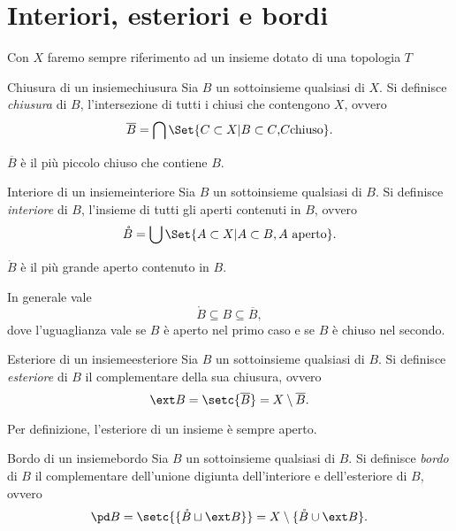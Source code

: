 \section{Interiori, esteriori e bordi}
Con \(X\) faremo sempre riferimento ad un insieme dotato di una topologia \(T\)

\begin{defn}{Chiusura di un insieme}{chiusura}
	Sia \(B\) un sottoinsieme qualsiasi di \(X\).
	Si definisce \emph{chiusura} di \(B\), l'intersezione di tutti i chiusi che contengono \(X\), ovvero
	\[
		\overline{B}=\bigcap\Set{C\subset X | B\subset C\text,C\text{chiuso}}.
	\]
\end{defn}

\begin{oss}
	\(\overline{B}\) è il più piccolo chiuso che contiene \(B\).
\end{oss}

\begin{defn}{Interiore di un insieme}{interiore}
	Sia \(B\) un sottoinsieme qualsiasi di \(B\).
	Si definisce \emph{interiore} di \(B\), l'insieme di tutti gli aperti contenuti in \(B\), ovvero
	\[
		\mathring{B}=\bigcup\Set{A\subset X | A\subset B,A\text{ aperto}}.
	\]
\end{defn}

\begin{oss}
	\(\mathring{B}\) è il più grande aperto contenuto in \(B\).
\end{oss}

\begin{oss}
	In generale vale
	\[
		\mathring{B}\subseteq B\subseteq \overline{B},
	\]
	dove l'uguaglianza vale se \(B\) è aperto nel primo caso e se \(B\) è chiuso nel secondo.
\end{oss}

\begin{defn}{Esteriore di un insieme}{esteriore}
	Sia \(B\) un sottoinsieme qualsiasi di \(B\).
	Si definisce \emph{esteriore} di \(B\) il complementare della sua chiusura, ovvero
	\[
		\ext B=\setc{\overline{B}}=X\setminus \overline{B}.
	\]
\end{defn}

\begin{oss}
	Per definizione, l'esteriore di un insieme è sempre aperto.
\end{oss}

\begin{defn}{Bordo di un insieme}{bordo}
	Sia \(B\) un sottoinsieme qualsiasi di \(B\).
	Si definisce \emph{bordo} di \(B\) il complementare dell'unione digiunta dell'interiore e dell'esteriore di \(B\), ovvero
	\[
		\pd B=\setc{\{\mathring{B}\sqcup \ext B\}}=X\setminus\{\mathring{B}\cup\ext B\}.
	\]
\end{defn}

